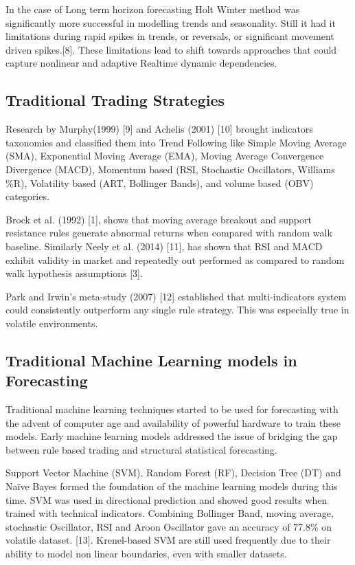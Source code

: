 In the case of Long term horizon forecasting Holt Winter method was significantly more successful in modelling trends and seasonality. Still it had it limitations during rapid spikes in trends, or reversals, or significant movement driven spikes.[8]. These limitations lead to shift towards approaches that could capture nonlinear and adaptive Realtime dynamic dependencies.

\subsection{Traditional Trading Strategies}

Research by Murphy(1999) [9] and Achelis (2001) [10] brought indicators taxonomies and classified them into Trend Following like Simple Moving Average (SMA), Exponential Moving Average (EMA),  Moving Average Convergence Divergence (MACD), Momentum based (RSI, Stochastic Oscillators, Williams \%R), Volatility based (ART, Bollinger Bands), and volume based (OBV) categories.

Brock et al. (1992) [1], shows that moving average breakout and support resistance rules generate abnormal returns when compared with random walk baseline. Similarly Neely et al. (2014) [11], has shown that RSI and MACD exhibit validity in market and repeatedly out performed as compared to random walk hypothesis assumptions [3].
 
Park and Irwin's meta-study (2007) [12] established that multi-indicators system could consistently outperform any single rule strategy. This was especially true in volatile environments.

\subsection{Traditional Machine Learning models in Forecasting}

Traditional machine learning techniques started to be used for forecasting with the advent of computer age and availability of powerful hardware to train these models. Early machine learning models addressed the issue of bridging the gap between rule based trading and structural statistical forecasting.

Support Vector Machine (SVM), Random Forest (RF), Decision Tree (DT) and Naïve Bayes formed the foundation of the machine learning models during this time. SVM was used in directional prediction and showed good results when trained with technical indicators. Combining Bollinger Band, moving average, stochastic Oscillator, RSI and Aroon Oscillator gave an accuracy of 77.8\% on volatile dataset. [13]. Krenel-based SVM are still used frequently due to their ability to model non linear boundaries, even with smaller datasets.

